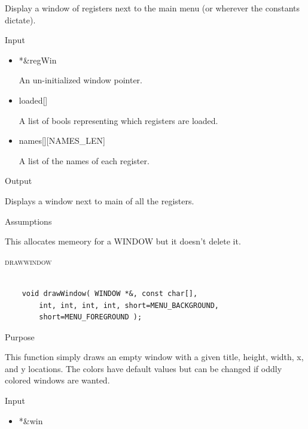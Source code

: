 \documentclass[pdftex, 11pt]{article}
\begin{document}
\begin{description}
\begin{description}
 				Display a window of registers next to the main menu (or wherever the constants
				dictate).

			\item{Input}
			
				\begin{itemize}

					\item{*\&regWin}
						
						An un-initialized window pointer.

					\item{loaded[]}

						A list of bools representing which registers are loaded.

					\item{names[][NAMES\_LEN]}

						A list of the names of each register.

				\end{itemize}

			\item{Output}

				Displays a window next to main of all the registers.

			\item{Assumptions}

				This allocates memeory for a WINDOW but it doesn't delete it.

		\end{description}


	\item{\textsc{drawwindow}}

		\begin{lstlisting}

	void drawWindow( WINDOW *&, const char[], 
		int, int, int, int, short=MENU_BACKGROUND, 
		short=MENU_FOREGROUND );
		\end{lstlisting}

		\begin{description}
			\item{Purpose}

				This function simply draws an empty window with a given title, height, width,
				x, and y locations.  The colors have default values but can be changed if
				oddly colored windows are wanted.

			\item{Input}

				\begin{itemize}

					\item{*\&win}


\end{itemize}
\end{description}
\end{description}
\end{document}
